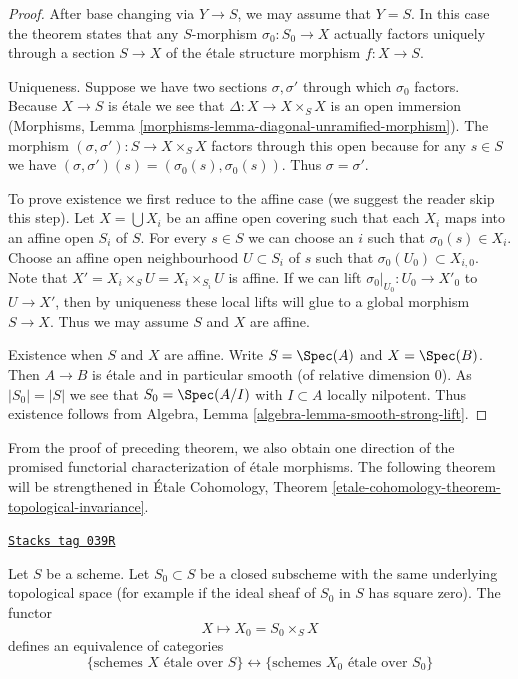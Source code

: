 \begin{proof}
After base changing via $Y \to S$, we may assume that $Y = S$.
In this case the theorem states that any $S$-morphism $\sigma_0 : S_0 \to X$
actually factors uniquely through a section $S \to X$ of the
\'etale structure morphism $f : X \to S$.

\medskip\noindent
Uniqueness. Suppose we have two sections $\sigma, \sigma'$
through which $\sigma_0$ factors. Because $X \to S$ is \'etale
we see that $\Delta : X \to X \times_S X$ is an open immersion
(Morphisms, Lemma \ref{morphisms-lemma-diagonal-unramified-morphism}).
The morphism $(\sigma, \sigma') : S \to X \times_S X$ factors
through this open because for any $s \in S$ we have
$(\sigma, \sigma')(s) = (\sigma_0(s), \sigma_0(s))$. Thus
$\sigma = \sigma'$.

\medskip\noindent
To prove existence we first reduce to the affine case
(we suggest the reader skip this step).
Let $X = \bigcup X_i$ be an affine open covering such
that each $X_i$ maps into an affine open $S_i$ of $S$.
For every $s \in S$ we can choose an $i$ such that
$\sigma_0(s) \in X_i$.
Choose an affine open neighbourhood $U \subset S_i$ of $s$
such that $\sigma_0(U_0) \subset X_{i, 0}$. Note that
$X' = X_i \times_S U = X_i \times_{S_i} U$ is affine.
If we can lift $\sigma_0|_{U_0} : U_0 \to X'_0$ to
$U \to X'$, then by uniqueness these local lifts will glue
to a global morphism $S \to X$. Thus we may assume $S$ and
$X$ are affine.

\medskip\noindent
Existence when $S$ and $X$ are affine. Write $S = \Spec(A)$
and $X = \Spec(B)$. Then $A \to B$ is \'etale and in particular
smooth (of relative dimension $0$). As $|S_0| = |S|$ we see
that $S_0 = \Spec(A/I)$ with $I \subset A$ locally nilpotent.
Thus existence follows from
Algebra, Lemma \ref{algebra-lemma-smooth-strong-lift}.
\end{proof}

From the proof of preceding theorem, we also obtain one direction of the
promised functorial characterization of \'etale morphisms. The following
theorem will be strengthened in
\'Etale Cohomology,
Theorem \ref{etale-cohomology-theorem-topological-invariance}.

\begin{theorem}

\label{etale-theorem-remarkable-equivalence}
\href{https://stacks.math.columbia.edu/tag/039R}{\texttt{Stacks tag 039R}}

\begin{reference}
\cite[IV, Theorem 18.1.2]{EGA}
\end{reference}
Let $S$ be a scheme.
Let $S_0 \subset S$ be a closed subscheme with the same underlying
topological space (for example if the ideal sheaf of $S_0$ in $S$
has square zero). The functor
$$
X \longmapsto X_0 = S_0 \times_S X
$$
defines an equivalence of categories
$$
\{
\text{schemes }X\text{ \'etale over }S
\}
\leftrightarrow
\{
\text{schemes }X_0\text{ \'etale over }S_0
\}
$$
\end{theorem}

